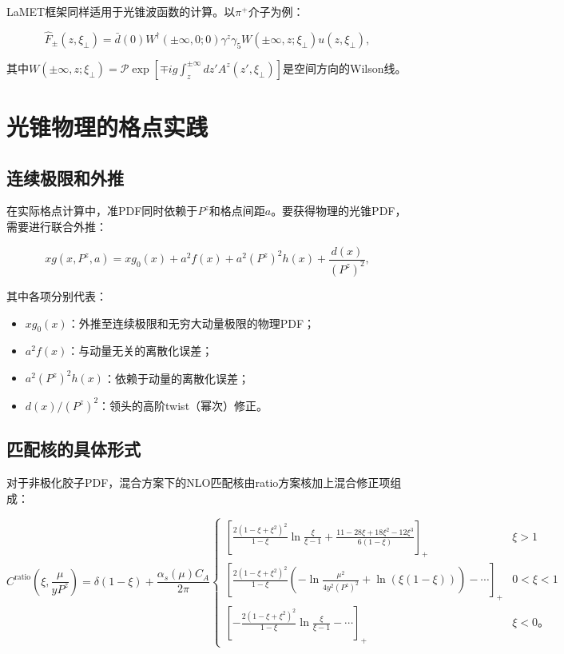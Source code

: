 \documentclass[12pt,a4paper]{ctexart}
\theoremstyle{definition}
\begin{document}
LaMET框架同样适用于光锥波函数的计算\cite{Ji2014LaMET}。以$\pi^+$介子为例：

\begin{equation}
\hat{F}_\pm(z, \xi_\perp) = \bar{d}(0) W^\dagger(\pm\infty, 0; 0) \gamma^z \gamma_5 W(\pm\infty, z; \xi_\perp) u(z, \xi_\perp),
\label{eq:LCWF_quasi}
\end{equation}

其中$W(\pm\infty, z; \xi_\perp) = \mathcal{P}\exp[\mp ig\int_z^{\pm\infty} dz' A^z(z', \xi_\perp)]$是空间方向的Wilson线。

\section{光锥物理的格点实践}

\subsection{连续极限和外推}

在实际格点计算中，准PDF同时依赖于$P^z$和格点间距$a$。要获得物理的光锥PDF，需要进行联合外推\cite{Chen2025gluon}：

\begin{equation}
xg(x, P^z, a) = xg_0(x) + a^2 f(x) + a^2 (P^z)^2 h(x) + \frac{d(x)}{(P^z)^2},
\label{eq:joint_extrap}
\end{equation}

其中各项分别代表：
\begin{itemize}
    \item $xg_0(x)$：外推至连续极限和无穷大动量极限的物理PDF；
    \item $a^2 f(x)$：与动量无关的离散化误差；
    \item $a^2 (P^z)^2 h(x)$：依赖于动量的离散化误差；
    \item $d(x)/(P^z)^2$：领头的高阶twist（幂次）修正。
\end{itemize}

\subsection{匹配核的具体形式}

对于非极化胶子PDF，混合方案下的NLO匹配核由ratio方案核加上混合修正项组成\cite{Chen2025gluon,Balitsky2020,Yao2023}：

\begin{equation}
C^{\text{ratio}}\left(\xi, \frac{\mu}{yP^z}\right) = \delta(1-\xi) + \frac{\alpha_s(\mu)C_A}{2\pi}
\begin{cases}
\left[\frac{2(1-\xi+\xi^2)^2}{1-\xi}\ln\frac{\xi}{\xi-1} + \frac{11-28\xi+18\xi^2-12\xi^3}{6(1-\xi)}\right]_+ & \xi > 1 \\
\left[\frac{2(1-\xi+\xi^2)^2}{1-\xi}\left(-\ln\frac{\mu^2}{4y^2(P^z)^2} + \ln(\xi(1-\xi))\right) - \cdots\right]_+ & 0 < \xi < 1 \\
\left[-\frac{2(1-\xi+\xi^2)^2}{1-\xi}\ln\frac{\xi}{\xi-1} - \cdots\right]_+ & \xi < 0。
\end{cases}
\label{eq:Cratio_full}
\end{equation}
\end{document}
